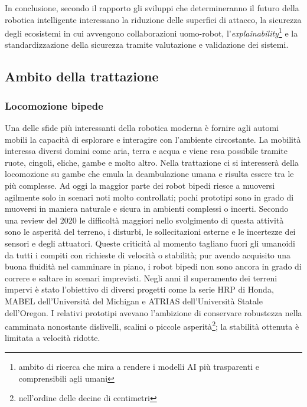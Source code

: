 In conclusione, secondo il rapporto \cite{neupane2024security} gli sviluppi che determineranno il futuro della robotica intelligente interessano la riduzione delle superfici di attacco, la sicurezza degli ecosistemi in cui avvengono collaborazioni uomo-robot, l'\textit{explainability}\footnote{ambito di ricerca che mira a rendere i modelli AI più trasparenti e comprensibili agli umani} e la standardizzazione della sicurezza tramite valutazione e validazione dei sistemi.

\subsection{Ambito della trattazione}
\subsubsection{Locomozione bipede}
Una delle sfide più interessanti della robotica moderna è fornire agli automi mobili la capacità di esplorare e interagire con l'ambiente circostante. La mobilità interessa diversi domini come aria, terra e acqua e viene resa possibile tramite ruote, cingoli, eliche, gambe e molto altro. Nella trattazione ci si interesserà della locomozione su gambe che emula la deambulazione umana e risulta essere tra le più complesse. Ad oggi la maggior parte dei robot bipedi riesce a muoversi agilmente solo in scenari noti molto controllati; pochi prototipi sono in grado di muoversi in maniera naturale e sicura in ambienti complessi o incerti. Secondo una review \cite{xie2020review} del 2020 le difficoltà maggiori nello svolgimento di questa attività sono le asperità del terreno, i disturbi, le sollecitazioni esterne e le incertezze dei sensori e degli attuatori. Queste criticità al momento tagliano fuori gli umanoidi da tutti i compiti con richieste di velocità o stabilità; pur avendo acquisito una buona fluidità nel camminare in piano, i robot bipedi non sono ancora in grado di correre e saltare in scenari imprevisti. Negli anni il superamento dei terreni impervi è stato l'obiettivo di diversi progetti come la serie HRP di Honda, MABEL dell'Università del Michigan e ATRIAS dell'Università Statale dell'Oregon. I relativi prototipi avevano l'ambizione di conservare robustezza nella camminata nonostante dislivelli, scalini o piccole asperità\footnote{nell'ordine delle decine di centimetri}; la stabilità ottenuta è limitata a velocità ridotte. 



